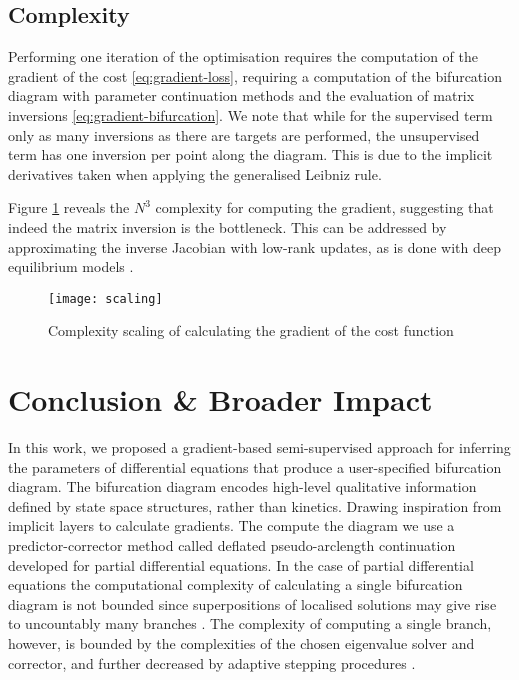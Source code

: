 \subsection{Complexity}
Performing one iteration of the optimisation requires the computation of the gradient of the cost \eqref{eq:gradient-loss}, requiring a computation of the bifurcation diagram with parameter continuation methods and the evaluation of matrix inversions \eqref{eq:gradient-bifurcation}. We note that while for the supervised term only as many inversions as there are targets are performed, the unsupervised term has one inversion per point along the diagram. This is due to the implicit derivatives taken when applying the generalised Leibniz rule.

Figure \ref{fig:scaling} reveals the $N^3$ complexity for computing the gradient, suggesting that indeed the matrix inversion is the bottleneck. This can be addressed by approximating the inverse Jacobian with low-rank updates, as is done with deep equilibrium models \cite{Bai2019DeepModels}.

\begin{figure}
\centering
\texttt{[image: scaling]}
\caption{Complexity scaling of calculating the gradient of the cost function}
\label{fig:scaling}
\end{figure}
 
\section{Conclusion \& Broader Impact}

In this work, we proposed a gradient-based semi-supervised approach for inferring the parameters of differential equations that produce a user-specified bifurcation diagram. The bifurcation diagram encodes high-level qualitative information defined by state space structures, rather than kinetics. Drawing inspiration from implicit layers \cite{Look2020DifferentiableLayers,Bai2019DeepModels} to calculate gradients. The compute the diagram we use a predictor-corrector method called deflated pseudo-arclength continuation \cite{Farrell2016TheDiagrams,Veltz2019PseudoArcLengthContinuation.jl} developed for partial differential equations. In the case of partial differential equations the computational complexity of calculating a single bifurcation diagram is not bounded since superpositions of localised solutions may give rise to uncountably many branches \cite{Avitabile2010ToEquation}. The complexity of computing a single branch, however, is bounded by the complexities of the chosen eigenvalue solver and corrector, and further decreased by adaptive stepping procedures \cite{Aruliah2016AlgorithmContinuation}.


